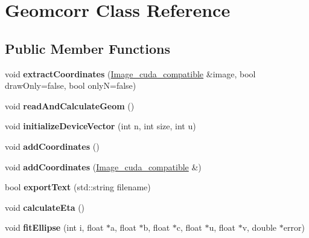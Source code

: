 \hypertarget{classGeomcorr}{}\section{Geomcorr Class Reference}
\label{classGeomcorr}
\subsection*{Public Member Functions}
\begin{DoxyCompactItemize}
\item 
void {\bfseries extract\+Coordinates} (\hyperlink{classImage__cuda__compatible}{Image\+\_\+cuda\+\_\+compatible} \&image, bool draw\+Only=false, bool onlyN=false)\hypertarget{classGeomcorr_a1c77404e2163d3d3f8d03d932b31ad20}{}\label{classGeomcorr_a1c77404e2163d3d3f8d03d932b31ad20}

\item 
void {\bfseries read\+And\+Calculate\+Geom} ()\hypertarget{classGeomcorr_a083128b51dc70ad6d94536e3f93a459a}{}\label{classGeomcorr_a083128b51dc70ad6d94536e3f93a459a}

\item 
void {\bfseries initialize\+Device\+Vector} (int n, int size, int u)\hypertarget{classGeomcorr_aaa49852e93cfd941148223eee0ddcee5}{}\label{classGeomcorr_aaa49852e93cfd941148223eee0ddcee5}

\item 
void {\bfseries add\+Coordinates} ()\hypertarget{classGeomcorr_a8119f3169e1abe814a5f03bf9fa90486}{}\label{classGeomcorr_a8119f3169e1abe814a5f03bf9fa90486}

\item 
void {\bfseries add\+Coordinates} (\hyperlink{classImage__cuda__compatible}{Image\+\_\+cuda\+\_\+compatible} \&)\hypertarget{classGeomcorr_a95eaae8131a0c9d953b8cf3e331c603c}{}\label{classGeomcorr_a95eaae8131a0c9d953b8cf3e331c603c}

\item 
bool {\bfseries export\+Text} (std\+::string filename)\hypertarget{classGeomcorr_a29d08ee02403ade8e71be177b2b4dd5e}{}\label{classGeomcorr_a29d08ee02403ade8e71be177b2b4dd5e}

\item 
void {\bfseries calculate\+Eta} ()\hypertarget{classGeomcorr_a3ffb751ba6ad0308f4fb60ce80ee106e}{}\label{classGeomcorr_a3ffb751ba6ad0308f4fb60ce80ee106e}

\item 
void {\bfseries fit\+Ellipse} (int i, float $\ast$a, float $\ast$b, float $\ast$c, float $\ast$u, float $\ast$v, double $\ast$error)\hypertarget{classGeomcorr_a2e5a7f6196fa85443c8d61032f610c2f}{}\label{classGeomcorr_a2e5a7f6196fa85443c8d61032f610c2f}


\end{DoxyCompactItemize}
